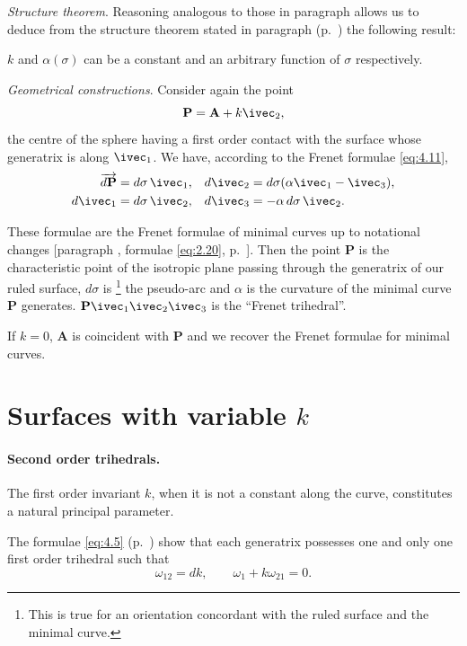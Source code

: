 \somespace

\emph{Structure theorem}. Reasoning analogous to those in paragraph  allows us to deduce from the structure theorem stated in paragraph  (p.~\pageref{sec:25}) the following result:

\somespace

$k$ and $\alpha(\sigma)$ can be a constant and an arbitrary function of $\sigma$ respectively.

\somespace

\emph{Geometrical constructions}. Consider again the point
\[
\mathbf{P}=\mathbf{A}+k\ivec_{2},
\]
the centre of the sphere having a first order contact with the surface whose generatrix is along $\ivec_1
$. We have, according to the Frenet formulae \eqref{eq:4.11},
\begin{align*}
  \overrightarrow{d\mathbf{P}}&=d\sigma\,\ivec_{1},&d\ivec_{2}&=d\sigma(\alpha\ivec_{1}-\ivec_{3}),\\
  d\ivec_{1}&=d\sigma\,\ivec_{2},&d\ivec_{3}&=-\alpha\,d\sigma\,\ivec_{2}.
\end{align*}

These formulae are the Frenet formulae of minimal curves up to notational changes [paragraph , formulae \eqref{eq:2.20}, p.~\pageref{eq:2.20}]. Then the point $\mathbf{P}$ is the characteristic point of the isotropic plane passing through the generatrix of our ruled surface, $d\sigma$ is \footnote{This is true for an orientation concordant with the ruled surface and the minimal curve.} the pseudo-arc and $\alpha$ is the curvature of the minimal curve $\mathbf{P}$ generates. $\mathbf{P}\ivec_{1}\ivec_{2}\ivec_{3}$ is the ``Frenet trihedral''.

If $k=0$, $\mathbf{A}$ is coincident with $\mathbf{P}$ and we recover the Frenet formulae for minimal curves.

\section{Surfaces with variable $k$}
\label{sec:surf-with-vari}

\paragraph{Second order trihedrals.}
\label{sec:56}
The first order invariant $k$, when it is not a constant along the curve, constitutes a natural principal parameter.

The formulae \eqref{eq:4.5} (p.~\pageref{eq:4.5}) show that each generatrix possesses one and only one first order trihedral such that
\begin{equation}
  \label{eq:4.12}
  \omega_{12}=dk,\qquad\omega_{1}+k\omega_{21}=0.
\end{equation}

